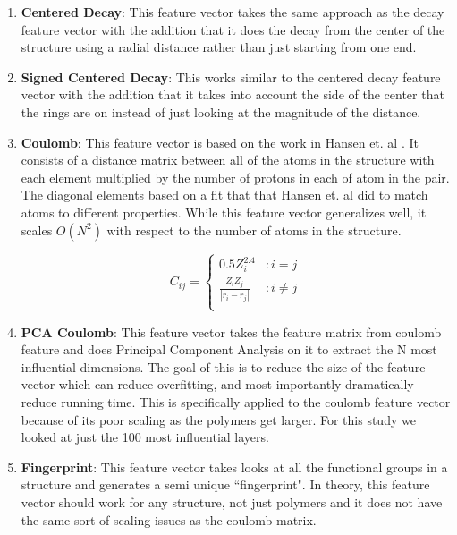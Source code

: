 \documentclass[10pt, oneside]{article}   	%
\begin{document}
\begin{enumerate}
\item \textbf{Centered Decay}: This feature vector takes the same approach as the decay feature vector with the addition that it does the decay from the center of the structure using a radial distance rather than just starting from one end.

\item \textbf{Signed Centered Decay}: This works similar to the centered decay feature vector with the addition that it takes into account the side of the center that the rings are on instead of just looking at the magnitude of the distance.

\item \textbf{Coulomb}: This feature vector is based on the work in Hansen et. al \cite{Hansen}. It consists of a distance matrix between all of the atoms in the structure with each element multiplied by the number of protons in each of atom in the pair. The diagonal elements based on a fit that that Hansen et. al did to match atoms to different properties. While this feature vector generalizes well, it scales $O(N^2)$ with respect to the number of atoms in the structure.

$$
 C_{ij} =
  \begin{cases}
       0.5 Z_i^{2.4} & : i = j \\
    \frac{Z_i Z_j}{| r_i - r_j |} & : i \neq j \\
  \end{cases}
$$

\item \textbf{PCA Coulomb}: This feature vector takes the feature matrix from coulomb feature and does Principal Component Analysis on it to extract the N most influential dimensions. The goal of this is to reduce the size of the feature vector which can reduce overfitting, and most importantly dramatically reduce running time. This is specifically applied to the coulomb feature vector because of its poor scaling as the polymers get larger. For this study we looked at just the 100 most influential layers.

\item \textbf{Fingerprint}: This feature vector takes looks at all the functional groups in a structure and generates a semi unique ``fingerprint". In theory, this feature vector should work for any structure, not just polymers and it does not have the same sort of scaling issues as the coulomb matrix.



\end{enumerate}
\end{document}
